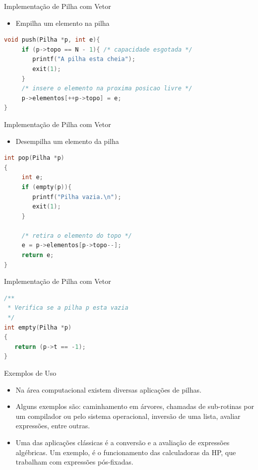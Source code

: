 \begin{frame}[fragile,c]{Implementação de Pilha com Vetor}
\begin{itemize}
	\item Empilha um elemento na pilha
\end{itemize}
\begin{lstlisting}[language=C]
void push(Pilha *p, int e){
     if (p->topo == N - 1){ /* capacidade esgotada */
        printf("A pilha esta cheia");
        exit(1);
     }
     /* insere o elemento na proxima posicao livre */
     p->elementos[++p->topo] = e;
}	
\end{lstlisting}  
\end{frame}

\begin{frame}[fragile,c]{Implementação de Pilha com Vetor}
\begin{itemize}
	\item Desempilha um elemento da pilha
\end{itemize}
\begin{lstlisting}[language=C]
int pop(Pilha *p)
{
     int e;
     if (empty(p)){
        printf("Pilha vazia.\n");
        exit(1);             
     } 
     
     /* retira o elemento do topo */
     e = p->elementos[p->topo--];
     return e;
}	
\end{lstlisting}  
\end{frame}


\begin{frame}[fragile]{Implementação de Pilha com Vetor}
\begin{lstlisting}[language=C]
/**
 * Verifica se a pilha p esta vazia
 */
int empty(Pilha *p)
{
   return (p->t == -1);
}

\end{lstlisting}
\end{frame}

\begin{frame}{Exemplos de Uso}
\begin{itemize}
	\item Na área computacional existem diversas aplicações de pilhas. 
	\item Alguns exemplos são: caminhamento em árvores, chamadas de sub-rotinas por um compilador ou pelo sistema operacional, inversão de uma lista, avaliar expressões, entre outras.
	\item Uma das aplicações clássicas é a conversão e a avaliação de expressões algébricas. Um exemplo, é o funcionamento das calculadoras da HP, que trabalham com expressões pós-fixadas.
\end{itemize}
\end{frame}


